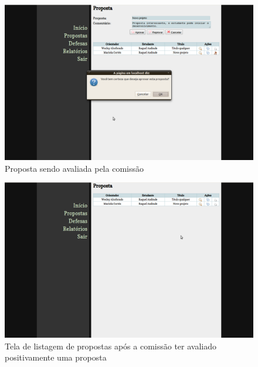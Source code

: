 \begin{figure}[htbp]
\centering
\includegraphics[width=1\textwidth]{fig/telas/processo/comissao_02_proposta_sendo_avaliada.png}
\caption{Proposta sendo avaliada pela comissão}
\label{fig:comissao_02_proposta_sendo_avaliada}
\end{figure}

\begin{figure}[htbp]
\centering
\includegraphics[width=1\textwidth]{fig/telas/processo/comissao_03_proposta_avaliada.png}
\caption{Tela de listagem de propostas após a comissão ter avaliado positivamente uma proposta}
\label{fig:comissao_03_proposta_avaliada}
\end{figure}

